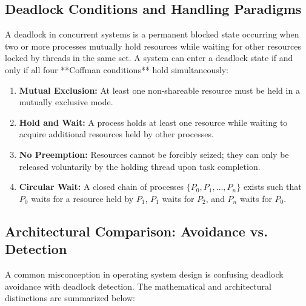 \documentclass[11pt,a4paper]{article}
\begin{document}
\subsection{Deadlock Conditions and Handling Paradigms}
A deadlock in concurrent systems is a permanent blocked state occurring when two or more processes mutually hold resources while waiting for other resources locked by threads in the same set. A system can enter a deadlock state if and only if all four **Coffman conditions** hold simultaneously:
\begin{enumerate}[leftmargin=1.5em,noitemsep]
    \item \textbf{Mutual Exclusion:} At least one non-shareable resource must be held in a mutually exclusive mode.
    \item \textbf{Hold and Wait:} A process holds at least one resource while waiting to acquire additional resources held by other processes.
    \item \textbf{No Preemption:} Resources cannot be forcibly seized; they can only be released voluntarily by the holding thread upon task completion.
    \item \textbf{Circular Wait:} A closed chain of processes $\{P_0, P_1, \dots, P_n\}$ exists such that $P_0$ waits for a resource held by $P_1$, $P_1$ waits for $P_2$, and $P_n$ waits for $P_0$.
\end{enumerate}

\subsection{Architectural Comparison: Avoidance vs. Detection}
A common misconception in operating system design is confusing deadlock avoidance with deadlock detection. The mathematical and architectural distinctions are summarized below:
\end{document}
